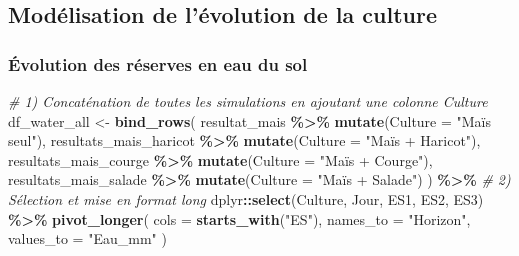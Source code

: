 \documentclass[
]{article}
\newenvironment{Shaded}{\begin{snugshade}}{\end{snugshade}}
\newcommand{\AttributeTok}[1]{\textcolor[rgb]{0.13,0.29,0.53}{#1}}
\newcommand{\CommentTok}[1]{\textcolor[rgb]{0.56,0.35,0.01}{\textit{#1}}}
\newcommand{\FunctionTok}[1]{\textcolor[rgb]{0.13,0.29,0.53}{\textbf{#1}}}
\newcommand{\NormalTok}[1]{#1}
\newcommand{\OtherTok}[1]{\textcolor[rgb]{0.56,0.35,0.01}{#1}}
\newcommand{\SpecialCharTok}[1]{\textcolor[rgb]{0.81,0.36,0.00}{\textbf{#1}}}
\newcommand{\StringTok}[1]{\textcolor[rgb]{0.31,0.60,0.02}{#1}}
\begin{document}
\newpage

\subsection{Modélisation de l'évolution de la
culture}\label{moduxe9lisation-de-luxe9volution-de-la-culture}

\subsubsection{Évolution des réserves en eau du
sol}\label{uxe9volution-des-ruxe9serves-en-eau-du-sol}

\begin{Shaded}
\begin{Highlighting}[]
\CommentTok{\# 1) Concaténation de toutes les simulations en ajoutant une colonne Culture}
\NormalTok{df\_water\_all }\OtherTok{\textless{}{-}} \FunctionTok{bind\_rows}\NormalTok{(}
\NormalTok{  resultat\_mais               }\SpecialCharTok{\%\textgreater{}\%} \FunctionTok{mutate}\NormalTok{(}\AttributeTok{Culture =} \StringTok{"Maïs seul"}\NormalTok{),}
\NormalTok{  resultats\_mais\_haricot      }\SpecialCharTok{\%\textgreater{}\%} \FunctionTok{mutate}\NormalTok{(}\AttributeTok{Culture =} \StringTok{"Maïs + Haricot"}\NormalTok{),}
\NormalTok{  resultats\_mais\_courge       }\SpecialCharTok{\%\textgreater{}\%} \FunctionTok{mutate}\NormalTok{(}\AttributeTok{Culture =} \StringTok{"Maïs + Courge"}\NormalTok{),}
\NormalTok{  resultats\_mais\_salade       }\SpecialCharTok{\%\textgreater{}\%} \FunctionTok{mutate}\NormalTok{(}\AttributeTok{Culture =} \StringTok{"Maïs + Salade"}\NormalTok{)}
\NormalTok{) }\SpecialCharTok{\%\textgreater{}\%}
  \CommentTok{\# 2) Sélection et mise en format long}
\NormalTok{  dplyr}\SpecialCharTok{::}\FunctionTok{select}\NormalTok{(Culture, Jour, ES1, ES2, ES3) }\SpecialCharTok{\%\textgreater{}\%}
  \FunctionTok{pivot\_longer}\NormalTok{(}
    \AttributeTok{cols      =} \FunctionTok{starts\_with}\NormalTok{(}\StringTok{"ES"}\NormalTok{),}
    \AttributeTok{names\_to  =} \StringTok{"Horizon"}\NormalTok{,}
    \AttributeTok{values\_to =} \StringTok{"Eau\_mm"}
\NormalTok{  )}


\end{Highlighting}
\end{Shaded}
\end{document}
